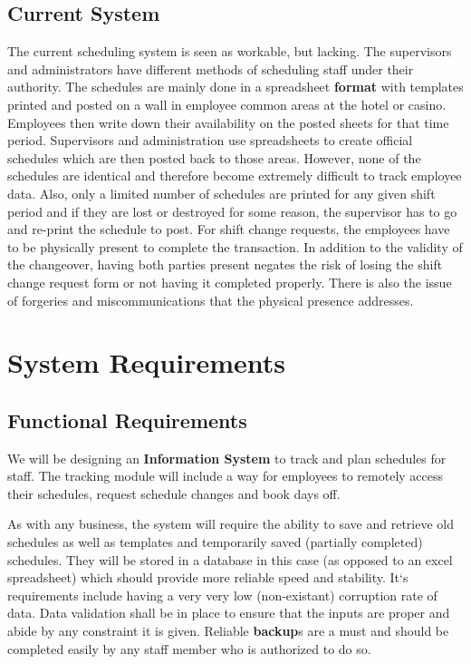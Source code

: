 \documentclass[letterpaper,12pt]{report}
\begin{document}
\section{Current System}
\hspace{1cm}The current scheduling system is seen as workable, but lacking. The supervisors and administrators have different methods of scheduling staff under their authority. The schedules are mainly done in a spreadsheet \textbf{format} with templates printed and posted on a wall in employee common areas at the hotel or casino. Employees then write down their availability on the posted sheets for that time period. Supervisors and administration use spreadsheets to create official schedules which are then posted back to those areas. However, none of the schedules are identical and therefore become extremely difficult to track employee data. Also, only a limited number of schedules are printed for any given shift period and if they are lost or destroyed for some reason, the supervisor has to go and re-print the schedule to post.
For shift change requests, the employees have to be physically present to complete the transaction. In addition to the validity of the changeover, having both parties present negates the risk of losing the shift change request form or not having it completed properly. There is also the issue of forgeries and miscommunications that the physical presence addresses.

\chapter{System Requirements}
\section{Functional Requirements}

We will be designing an \textbf{Information System} to track and plan schedules for staff. The tracking module will include a way for employees to remotely access their schedules, request schedule changes and book days off.

As with any business, the system will require the ability to save and retrieve old schedules as well as templates and temporarily saved (partially completed) schedules. They will be stored in a database in this case (as opposed to an excel spreadsheet) which should provide more reliable speed and stability. It`s requirements include having a very very low (non-existant) corruption rate of data. Data validation shall be in place to ensure that the inputs are proper and abide by any constraint it is given. Reliable \textbf{backup}s are a must and should be completed easily by any staff member who is authorized to do so.
\end{document}
